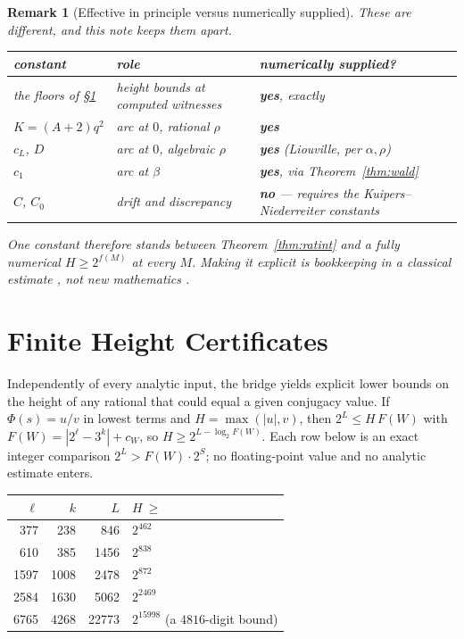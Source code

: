 \documentclass[11pt]{article}
\newtheorem*{remark}{Remark}
\newcommand{\cw}{c_W}
\begin{document}
\begin{remark}[Effective in principle versus numerically supplied]
\label{rem:effectivity}
These are different, and this note keeps them apart.
\begin{center}
\begin{tabular}{@{}lll@{}}
\toprule
constant & role & numerically supplied? \\
\midrule
the floors of \S\ref{sec:certificates} & height bounds at computed witnesses & \textbf{yes}, exactly \\
$K=(A+2)q^2$ & arc at $0$, rational $\rho$ & \textbf{yes} \\
$c_L$, $D$ & arc at $0$, algebraic $\rho$ & \textbf{yes} (Liouville, per $\alpha,\rho$) \\
$c_1$ & arc at $\beta$ & \textbf{yes}, via Theorem~\ref{thm:wald} \\
$C$, $C_0$ & drift and discrepancy & \textbf{no} --- requires the Kuipers--Niederreiter constants \\
\bottomrule
\end{tabular}
\end{center}
One constant therefore stands between Theorem~\ref{thm:ratint} and a fully numerical
$H\ge2^{f(M)}$ at every $M$. Making it explicit is bookkeeping in a classical estimate
\cite{KuipersNiederreiter}, not new mathematics \cite{Phase13Constants}.
\end{remark}

\section{Finite Height Certificates}
\label{sec:certificates}

Independently of every analytic input, the bridge yields explicit lower bounds on the height of any
rational that could equal a given conjugacy value. If $\Phi(s)=u/v$ in lowest terms and
$H=\max(|u|,v)$, then $2^{L}\le H\,F(W)$ with $F(W)=|2^\ell-3^k|+\cw$, so
$H\ge2^{L-\log_2F(W)}$. Each row below is an exact integer comparison $2^L>F(W)\cdot2^S$; no
floating-point value and no analytic estimate enters.

\begin{center}
\begin{tabular}{@{}rrrl@{}}
\toprule
$\ell$ & $k$ & $L$ & $H\ \ge$ \\
\midrule
377 & 238 & 846 & $2^{462}$ \\
610 & 385 & 1456 & $2^{838}$ \\
1597 & 1008 & 2478 & $2^{872}$ \\
2584 & 1630 & 5062 & $2^{2469}$ \\
6765 & 4268 & 22773 & $2^{15998}$ \quad(a $4816$-digit bound) \\
\bottomrule
\end{tabular}
\end{center}
\end{document}
